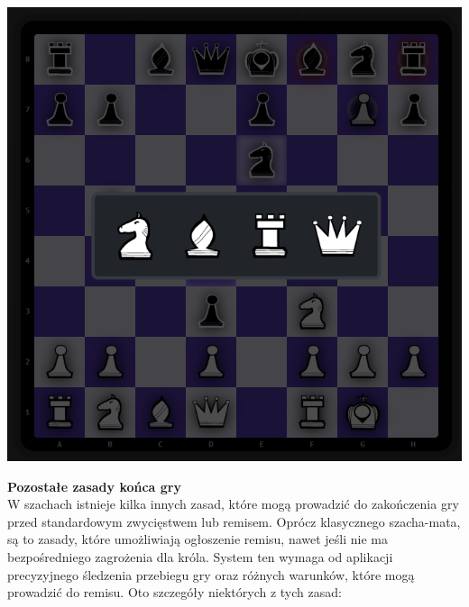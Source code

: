 \documentclass[12pt,a4paper]{article}
\begin{document}
\hfill 
\begin{minipage}[t]{0.3\textwidth} 
    \vspace{0pt} 
    \centering 
    \includegraphics[width=\linewidth]{images/imp_front_promotion.png} 
\end{minipage}

\newpage

\noindent \textbf{Pozostałe zasady końca gry}\\
W szachach istnieje kilka innych zasad, które mogą prowadzić do zakończenia gry przed standardowym zwycięstwem lub remisem. Oprócz klasycznego szacha-mata, są to zasady, które umożliwiają ogłoszenie remisu, nawet jeśli nie ma bezpośredniego zagrożenia dla króla. System ten wymaga od aplikacji precyzyjnego śledzenia przebiegu gry oraz różnych warunków, które mogą prowadzić do remisu. Oto szczegóły niektórych z tych zasad:
\end{document}
